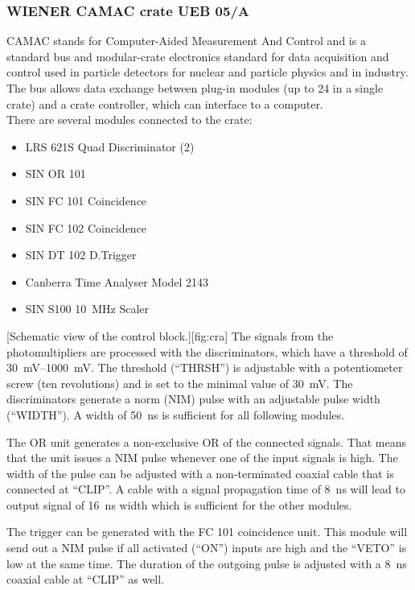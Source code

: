 \subsubsection*{WIENER CAMAC crate UEB 05/A}
CAMAC stands for Computer-Aided Measurement And Control and is a standard bus and modular-crate electronics standard for data acquisition and control used in particle detectors for nuclear and particle physics and in industry. The bus allows data exchange between plug-in modules (up to 24 in a single crate) and a crate controller, which can interface to a computer.\\
There are several modules connected to the crate:
\begin{itemize}
	\item LRS 621S Quad Discriminator (2)
	\item SIN OR 101
	\item SIN FC 101 Coincidence
	\item SIN FC 102 Coincidence
	\item SIN DT 102 D.Trigger
	\item Canberra Time Analyser Model 2143
	\item SIN S100 \SI{10}{\mega\hertz} Scaler
\end{itemize}
[Schematic view of the control block.][fig:cra]
The signals from the photomultipliers are processed with the discriminators, which have a threshold of \SIrange{30}{1000}{\milli\volt}. The threshold (``THRSH'') is adjustable with a potentiometer screw (ten revolutions) and is set to the minimal value of \SI{30}{\milli\volt}. The discriminators generate a norm (NIM) pulse with an adjustable pulse width (``WIDTH''). A width of \SI{50}{\nano\second} is sufficient for all following modules.\par
The OR unit generates a non-exclusive OR of the connected signals. That means that the unit issues a NIM pulse whenever one of the input signals is high. The width of the pulse can be adjusted with a non-terminated coaxial cable that is connected at ``CLIP''. A cable with a signal propagation time of \SI{8}{\nano\second} will lead to output signal of \SI{16}{\nano\second} width which is sufficient for the other modules.\par
The trigger can be generated with the FC 101 coincidence unit. This module will send out a NIM pulse if all activated (``ON'') inputs are high and the ``VETO'' is low at the same time. The duration of the outgoing pulse is adjusted with a \SI{8}{\nano\second} coaxial cable at ``CLIP'' as well.\par
